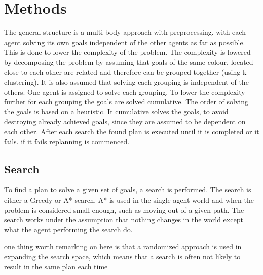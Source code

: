 \documentclass[letterpaper]{article}
\begin{document}
\section{Methods}
%		
%		
%		
		The general structure is a multi body approach with preprocessing. with each agent solving its own goals independent of the other agents as far as possible. This is done to lower the complexity of the problem. The complexity is lowered by decomposing the problem by assuming that goals of the same colour, located close to each other are related and therefore can be grouped together (using k-clustering). It is also assumed that solving each grouping is independent of the others. One agent is assigned to solve each grouping. 
		To lower the complexity further for each grouping the goals are solved cumulative. The order of solving the goals is based on a heuristic. It cumulative solves the goals, to avoid destroying already achieved goals, since they are assumed to be dependent on each other. After each search the found plan is executed until it is completed or it fails. if it fails replanning is commenced.

 
				
	\subsection{Search}
		To find a plan to solve a given set of goals, a search is performed. The search is either a Greedy or A* search. A* is used in the single agent world and when the problem is considered small enough, such as moving out of a given path. 
		The search works under the assumption that nothing changes in the world except what the agent performing the search do.
		
		one thing worth remarking on here is that a randomized approach is used in expanding the search space, which means that a search is often not likely to result in the same plan each time
		
%		
\end{document}
